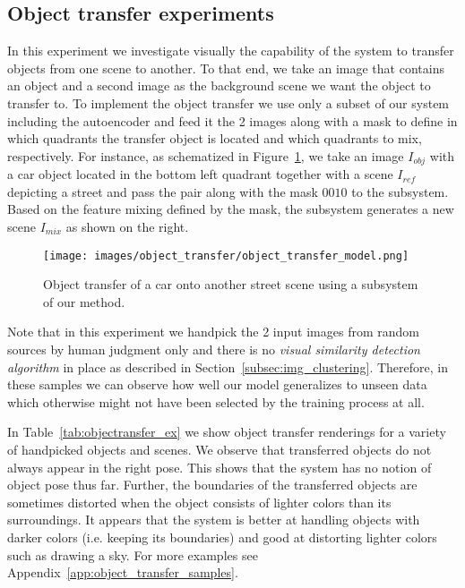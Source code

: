 \documentclass[a4paper,12pt]{report}
\begin{document}
\subsection{Object transfer experiments}\label{subsubsec:objTransfExp}
In this experiment we investigate visually the capability of the system to transfer objects from one scene to another. To that end, we take an image that contains an object and a second image as the background scene we want the object to transfer to. To implement the object transfer we use only a subset of our system including the autoencoder and feed it the 2 images along with a mask to define in which quadrants the transfer object is located and which quadrants to mix, respectively. For instance, as schematized in Figure~\ref{fig:objectransfer_arch}, we take an image $I_{obj}$ with a car object located in the bottom left quadrant together with a scene $I_{ref}$ depicting a street and pass the pair along with the mask $0010$ to the subsystem. Based on the feature mixing defined by the mask, the subsystem generates a new scene $I_{mix}$ as shown on the right.
\begin{figure}[ht]
\centering
\texttt{[image: images/object\_transfer/object\_transfer\_model.png]}
\caption{Object transfer of a car onto another street scene using a subsystem of our method.}
\label{fig:objectransfer_arch}
\end{figure}
Note that in this experiment we handpick the 2 input images from random sources by human judgment only and there is no \textit{visual similarity detection algorithm} in place as described in Section~\ref{subsec:img_clustering}. Therefore, in these samples we can observe how well our model generalizes to unseen data which otherwise might not have been selected by the training process at all.

In Table~\ref{tab:objectransfer_ex} we show object transfer renderings for a variety of handpicked objects and scenes. We observe that transferred objects do not always appear in the right pose. This shows that the system has no notion of object pose thus far. Further, the boundaries of the transferred objects are sometimes distorted when the object consists of lighter colors than its surroundings. It appears that the system is better at handling objects with darker colors (i.e. keeping its boundaries) and good at distorting lighter colors such as drawing a sky. For more examples see Appendix~\ref{app:object_transfer_samples}.

\end{document}
